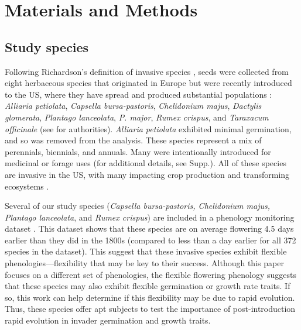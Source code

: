 \documentclass[12pt]{article}\usepackage[]{graphicx}\usepackage[]{color}
\begin{document}
	\section{Materials and Methods}
	\subsection{Study species}
	Following Richardson's definition of invasive species \parencite[][, see Supp. for details]{Richardson2000, Richardson2011}, seeds were collected from eight herbaceous species that originated in Europe but were recently introduced to the US, where they have spread and produced substantial populations \parencite{Uva1997}:\textit{ Alliaria petiolata}, \textit{Capsella bursa-pastoris}, \textit{Chelidonium majus}, \textit{Dactylis glomerata},  \textit{Plantago lanceolata}, \textit{P.  major}, \textit{Rumex crispus}, and \textit{Taraxacum officinale} (see \textcite{Haines2011} for authorities). \textit{Alliaria petiolata} exhibited minimal germination, and so was removed from the analysis. These species represent a mix of perennials, biennials, and annuals. Many were intentionally introduced for medicinal or forage uses (for additional details, see Supp.).  All of these species are invasive in the US, with many impacting crop production and transforming ecosystems \parencite[e.g.,][]{Froese2003,Wolfe2008}. 

Several of our study species (\textit{Capsella bursa-pastoris, Chelidonium majus, Plantago lanceolata}, and \textit{Rumex crispus}) are included in a phenology monitoring dataset \parencite[the Concord Phenology Dataset,][]{Willis:2008bf}. This dataset shows that these species  are on average flowering 4.5 days earlier than they did in the 1800s (compared to less than a day earlier for all 372 species in the dataset). This suggest that these invasive species exhibit flexible phenologies---flexibility that may be key to their success. Although this paper focuses on a different set of phenologies, the flexible flowering phenology suggests that these species may also exhibit flexible germination or growth rate traits. If so, this work can help determine if this flexibility may be due to rapid evolution. Thus, these species offer apt subjects to test the importance of post-introduction rapid evolution in invader germination and growth traits. %
\end{document}
